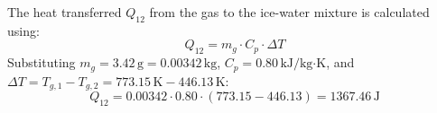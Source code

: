 The heat transferred \( Q_{12} \) from the gas to the ice-water mixture is calculated using:  
\[
Q_{12} = m_g \cdot C_p \cdot \Delta T
\]  
Substituting \( m_g = 3.42 \, \text{g} = 0.00342 \, \text{kg} \), \( C_p = 0.80 \, \text{kJ/kg·K} \), and \( \Delta T = T_{g,1} - T_{g,2} = 773.15 \, \text{K} - 446.13 \, \text{K} \):  
\[
Q_{12} = 0.00342 \cdot 0.80 \cdot (773.15 - 446.13) = 1367.46 \, \text{J}
\]